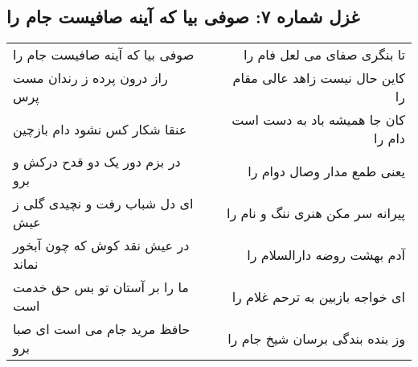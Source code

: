 \begin{center}
\section*{غزل شماره ۷: صوفی بیا که آینه صافیست جام را}
\label{sec:sh007}
\begin{longtable}{l p{0.5cm} r}
صوفی بیا که آینه صافیست جام را
&&
تا بنگری صفای می لعل فام را
\\
راز درون پرده ز رندان مست پرس
&&
کاین حال نیست زاهد عالی مقام را
\\
عنقا شکار کس نشود دام بازچین
&&
کان جا همیشه باد به دست است دام را
\\
در بزم دور یک دو قدح درکش و برو
&&
یعنی طمع مدار وصال دوام را
\\
ای دل شباب رفت و نچیدی گلی ز عیش
&&
پیرانه سر مکن هنری ننگ و نام را
\\
در عیش نقد کوش که چون آبخور نماند
&&
آدم بهشت روضه دارالسلام را
\\
ما را بر آستان تو بس حق خدمت است
&&
ای خواجه بازبین به ترحم غلام را
\\
حافظ مرید جام می است ای صبا برو
&&
وز بنده بندگی برسان شیخ جام را
\\
\end{longtable}
\end{center}
